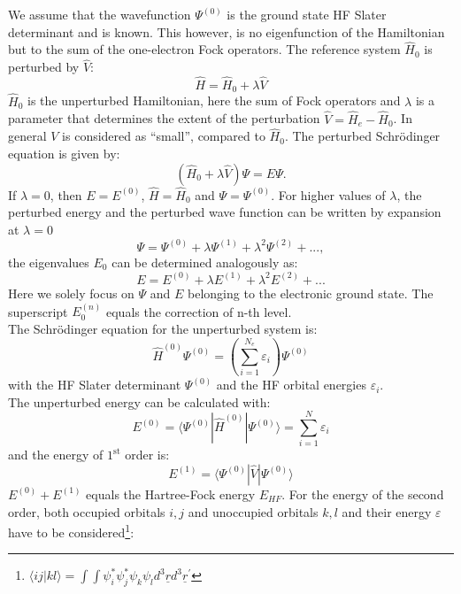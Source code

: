 \documentclass[11pt,DIV=13,BCOR=5mm,a4paper,headinclude]{scrbook}
\renewcommand{\vec}[1]{\underline{#1}}
\begin{document}
We assume that the wavefunction $\Psi^{(0)}$ is the ground state HF Slater determinant and is known.
This however, is no eigenfunction of the Hamiltonian but to the sum of the one-electron Fock operators.
The reference system $\hat{H}_0$ is perturbed by $\hat{V}$:
\begin{equation}
 \hat{H} = \hat{H}_0 + \lambda \hat{V}
\end{equation}
$\hat{H}_0$ is the unperturbed Hamiltonian, here the sum of Fock operators and $\lambda$ is a parameter that determines the extent of the perturbation $\hat{V}=\hat{H}_e - \hat{H}_0$.
In general $V$ is considered as ``small'', compared to $\hat{H}_0$.
The perturbed Schrödinger equation is given by:
\begin{equation}
 (\hat{H}_0 + \lambda \hat{V})\Psi = E\Psi.
\end{equation}
If $\lambda=0$, then $E=E^{(0)}$, $\hat{H} = \hat{H}_0$ and $\Psi=\Psi^{(0)}$.
For higher values of $\lambda$, the perturbed energy and the perturbed wave function can be written by expansion at $\lambda=0$
\begin{equation}
 \Psi = \Psi^{(0)} + \lambda \Psi^{(1)} + \lambda^2\Psi^{(2)} + ...,
\end{equation}
the eigenvalues $E_0$ can be determined analogously as:
\begin{equation}
 E = E^{(0)} + \lambda E^{(1)} + \lambda^2E^{(2)} + ...
\end{equation}
Here we solely focus on $\Psi$ and $E$ belonging to the electronic ground state.
The superscript $E_0^{(n)}$ equals the correction of n-th level.\\
The Schrödinger equation for the unperturbed system is:
\begin{equation}
 \hat{H}^{(0)}\Psi^{(0)}=(\sum_{i=1}^{N_e} \varepsilon_i)\Psi^{(0)}
\end{equation}
with the HF Slater determinant $\Psi^{(0)}$ and the HF orbital energies $\varepsilon_i$.\\
The unperturbed energy can be calculated with:
\begin{equation}
 E^{(0)} = \langle\Psi^{(0)}|\hat{H}^{(0)}|\Psi^{(0)}\rangle=\sum\limits_{i=1}^N\varepsilon_i
\end{equation}
and the energy of $1^\textrm{st}$ order is:
\begin{equation}
 E^{(1)} = \langle\Psi^{(0)}|\hat{V}|\Psi^{(0)}\rangle
\end{equation}
$E^{(0)}+E^{(1)}$ equals the Hartree-Fock energy $E_{HF}$.
For the energy of the second order, both occupied orbitals $i,j$ and unoccupied orbitals $k,l$ and their energy $\varepsilon$ have to be considered\footnote{$\langle ij|kl\rangle=\int\int\psi^\ast_i\psi^\ast_j\psi_k\psi_l d^3\vec{r}d^3\vec{r}^\prime$}:
\end{document}
